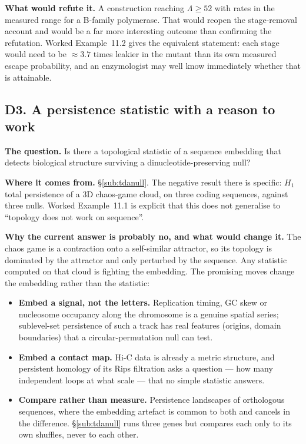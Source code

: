 \textbf{What would refute it.} A construction reaching $\Lambda \ge 52$ with
rates in the measured range for a B-family polymerase. That would reopen the
stage-removal account and would be a far more interesting outcome than
confirming the refutation. Worked Example~11.2 gives the equivalent statement:
each stage would need to be $\approx 3.7$ times leakier in the mutant than its
own measured escape probability, and an enzymologist may well know immediately
whether that is attainable.

\subsection*{D3. A persistence statistic with a reason to work}

\textbf{The question.} Is there a topological statistic of a sequence embedding
that detects biological structure surviving a dinucleotide-preserving null?

\textbf{Where it comes from.} \S\ref{sub:tdanull}. The negative result there is
specific: $H_1$ total persistence of a 3D chaos-game cloud, on three coding
sequences, against three nulls. Worked Example~11.1 is explicit that this does
not generalise to ``topology does not work on sequence''.

\textbf{Why the current answer is probably no, and what would change it.} The
chaos game is a contraction onto a self-similar attractor, so its topology is
dominated by the attractor and only perturbed by the sequence. Any statistic
computed on that cloud is fighting the embedding. The promising moves change the
embedding rather than the statistic:
\begin{itemize}[leftmargin=*,itemsep=1pt,topsep=2pt]
  \item \textbf{Embed a signal, not the letters.} Replication timing, GC skew or
        nucleosome occupancy along the chromosome is a genuine spatial series;
        sublevel-set persistence of such a track has real features (origins,
        domain boundaries) that a circular-permutation null can test.
  \item \textbf{Embed a contact map.} Hi-C data is already a metric structure,
        and persistent homology of its Rips filtration asks a question ---
        how many independent loops at what scale --- that no simple statistic
        answers.
  \item \textbf{Compare rather than measure.} Persistence landscapes of
        orthologous sequences, where the embedding artefact is common to both and
        cancels in the difference. \S\ref{sub:tdanull} runs three genes but
        compares each only to its own shuffles, never to each other.
\end{itemize}

